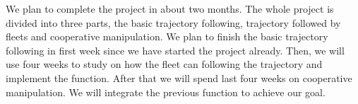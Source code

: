 \documentclass[letterpaper, 10 pt, conference]{ieeeconf}  %
\begin{document}
We plan to complete the project in about two months. The whole project is divided into three parts, the basic trajectory following, trajectory followed by fleets and cooperative manipulation. We plan to finish the basic trajectory following in first week since we have started the project already. Then, we will use four weeks to study on how the fleet can following the trajectory and implement the function. After that we will spend last four weeks on cooperative manipulation. We will integrate the previous function to achieve our goal.

\addtolength{\textheight}{-12cm}   %



\end{document}
